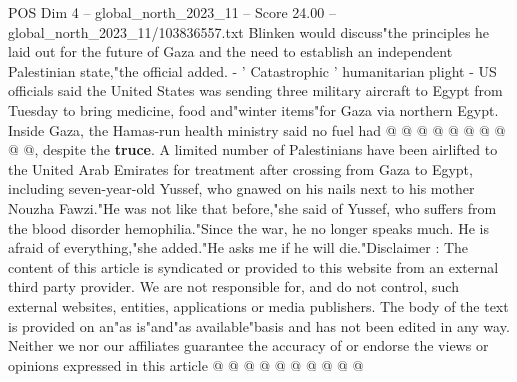 \begin{textsample}{POS Dim 4 – global\_north\_2023\_11 – Score 24.00 – global\_north\_2023\_11/103836557.txt}
Blinken would discuss"the principles he laid out for the future of Gaza and the need to establish an independent Palestinian state,"the official added. - ' Catastrophic ' humanitarian plight - US officials said the United States was sending three military aircraft to Egypt from Tuesday to bring medicine, food and"winter items"for Gaza via northern Egypt.
Inside Gaza, the Hamas-run health ministry said no fuel had @ @ @ @ @ @ @ @ @ @, despite the \textbf{truce}.
A limited number of Palestinians have been airlifted to the United Arab Emirates for treatment after crossing from Gaza to Egypt, including seven-year-old Yussef, who gnawed on his nails next to his mother Nouzha Fawzi."He was not like that before,"she said of Yussef, who suffers from the blood disorder hemophilia."Since the war, he no longer speaks much.
He is afraid of everything,"she added."He asks me if he will die."Disclaimer : The content of this article is syndicated or provided to this website from an external third party provider.
We are not responsible for, and do not control, such external websites, entities, applications or media publishers.
The body of the text is provided on an"as is"and"as available"basis and has not been edited in any way.
Neither we nor our affiliates guarantee the accuracy of or endorse the views or opinions expressed in this article @ @ @ @ @ @ @ @ @ @

\end{textsample}
